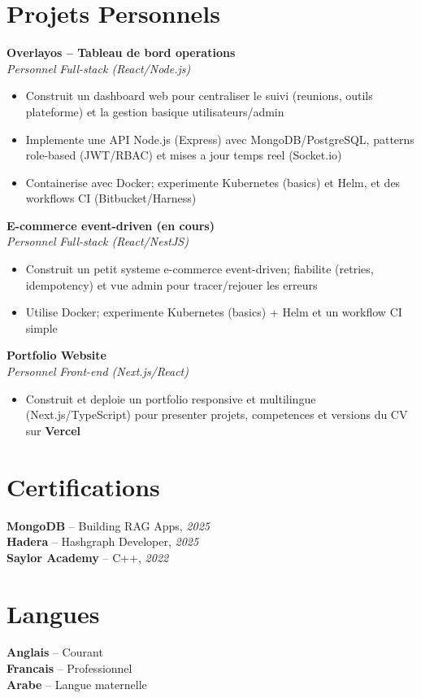 \documentclass[10pt,a4paper]{article}
\begin{document}
\vspace{4pt}
\section*{Projets Personnels}
{\small
\textbf{Overlayos -- Tableau de bord operations}\\[1pt]
\textit{Personnel} \hfill \textit{Full-stack (React/Node.js)}
\begin{itemize}
  \item Construit un dashboard web pour centraliser le suivi (reunions, outils plateforme) et la gestion basique utilisateurs/admin
  \item Implemente une API Node.js (Express) avec MongoDB/PostgreSQL, patterns role-based (JWT/RBAC) et mises a jour temps reel (Socket.io)
  \item Containerise avec Docker; experimente Kubernetes (basics) et Helm, et des workflows CI (Bitbucket/Harness)
\end{itemize}

\vspace{2pt}
\textbf{E-commerce event-driven (en cours)}\\[1pt]
\textit{Personnel} \hfill \textit{Full-stack (React/NestJS)}
\begin{itemize}
  \item Construit un petit systeme e-commerce event-driven; fiabilite (retries, idempotency) et vue admin pour tracer/rejouer les erreurs
  \item Utilise Docker; experimente Kubernetes (basics) + Helm et un workflow CI simple
\end{itemize}

\textbf{Portfolio Website}\\[1pt]
\textit{Personnel} \hfill \textit{Front-end (Next.js/React)}
\begin{itemize}
  \item Construit et deploie un portfolio responsive et multilingue (Next.js/TypeScript) pour presenter projets, competences et versions du CV sur \textbf{Vercel}
\end{itemize}
}

\vspace{3pt}
\section*{Certifications}
{\small
\textbf{MongoDB} -- Building RAG Apps, \textit{2025}\\[1pt]
\textbf{Hadera} -- Hashgraph Developer, \textit{2025}\\[1pt]
\textbf{Saylor Academy} -- C++, \textit{2022}
}

\section*{Langues}
{\small
\textbf{Anglais} -- Courant\\[1pt]
\textbf{Francais} -- Professionnel\\[1pt]
\textbf{Arabe} -- Langue maternelle
}
\end{document}

